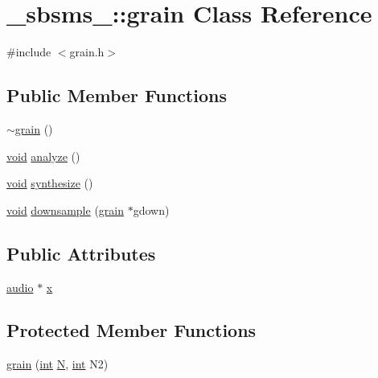 \hypertarget{class__sbsms___1_1grain}{}\section{\+\_\+sbsms\+\_\+\+:\+:grain Class Reference}
\label{class__sbsms___1_1grain}


{\ttfamily \#include $<$grain.\+h$>$}

\subsection*{Public Member Functions}
\begin{DoxyCompactItemize}
\item 
\hyperlink{class__sbsms___1_1grain_a1635ce5aa8e3457ce28cbbed50d9f9be}{$\sim$grain} ()
\item 
\hyperlink{sound_8c_ae35f5844602719cf66324f4de2a658b3}{void} \hyperlink{class__sbsms___1_1grain_a125a0745bb6d783c79bf89dc7d614e7f}{analyze} ()
\item 
\hyperlink{sound_8c_ae35f5844602719cf66324f4de2a658b3}{void} \hyperlink{class__sbsms___1_1grain_a90080f06525b6333e5f644da251df08b}{synthesize} ()
\item 
\hyperlink{sound_8c_ae35f5844602719cf66324f4de2a658b3}{void} \hyperlink{class__sbsms___1_1grain_a17be22b8bc00d0f3d4e9f46fd13e0cad}{downsample} (\hyperlink{class__sbsms___1_1grain}{grain} $\ast$gdown)
\end{DoxyCompactItemize}
\subsection*{Public Attributes}
\begin{DoxyCompactItemize}
\item 
\hyperlink{namespace__sbsms___a11786cc5bd221ff534972ae350477324}{audio} $\ast$ \hyperlink{class__sbsms___1_1grain_ad23cc1dc0b4f517bcc71338fc82b75a7}{x}
\end{DoxyCompactItemize}
\subsection*{Protected Member Functions}
\begin{DoxyCompactItemize}
\item 
\hyperlink{class__sbsms___1_1grain_a119c5b3b7d9defba2e9686363fb4d439}{grain} (\hyperlink{xmltok_8h_a5a0d4a5641ce434f1d23533f2b2e6653}{int} \hyperlink{class__sbsms___1_1grain_a007c0c0c9a0eed728ae3fb4aa379b145}{N}, \hyperlink{xmltok_8h_a5a0d4a5641ce434f1d23533f2b2e6653}{int} N2)
\end{DoxyCompactItemize}
